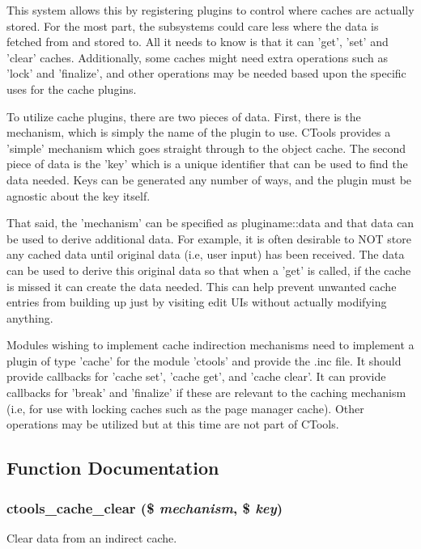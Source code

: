 This system allows this by registering plugins to control where caches are actually stored. For the most part, the subsystems could care less where the data is fetched from and stored to. All it needs to know is that it can 'get', 'set' and 'clear' caches. Additionally, some caches might need extra operations such as 'lock' and 'finalize', and other operations may be needed based upon the specific uses for the cache plugins.

To utilize cache plugins, there are two pieces of data. First, there is the mechanism, which is simply the name of the plugin to use. CTools provides a 'simple' mechanism which goes straight through to the object cache. The second piece of data is the 'key' which is a unique identifier that can be used to find the data needed. Keys can be generated any number of ways, and the plugin must be agnostic about the key itself.

That said, the 'mechanism' can be specified as pluginame::data and that data can be used to derive additional data. For example, it is often desirable to NOT store any cached data until original data (i.e, user input) has been received. The data can be used to derive this original data so that when a 'get' is called, if the cache is missed it can create the data needed. This can help prevent unwanted cache entries from building up just by visiting edit UIs without actually modifying anything.

Modules wishing to implement cache indirection mechanisms need to implement a plugin of type 'cache' for the module 'ctools' and provide the .inc file. It should provide callbacks for 'cache set', 'cache get', and 'cache clear'. It can provide callbacks for 'break' and 'finalize' if these are relevant to the caching mechanism (i.e, for use with locking caches such as the page manager cache). Other operations may be utilized but at this time are not part of CTools. 

\subsection{Function Documentation}
\hypertarget{profiles_2dosomething_2modules_2contrib_2ctools_2includes_2cache_8inc_a101263b0d8cf633a221db17bff52e47b}{
\subsubsection[{ctools\_\-cache\_\-clear}]{\setlength{\rightskip}{0pt plus 5cm}ctools\_\-cache\_\-clear (\$ {\em mechanism}, \/  \$ {\em key})}}
\label{profiles_2dosomething_2modules_2contrib_2ctools_2includes_2cache_8inc_a101263b0d8cf633a221db17bff52e47b}
Clear data from an indirect cache.


